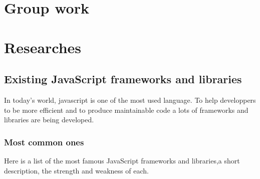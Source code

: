 \documentclass[12pt]{report}%
\begin{document}
\chapter{Group work}


\chapter{Researches}
\section{Existing JavaScript frameworks and libraries}
In today's world, javascript is one of the most used language. To help developpers to be more efficient and to produce maintainable code a lots of frameworks and libraries are being developed. 

\subsection{Most common ones}
Here is a list of the most famous JavaScript frameworks and libraries,a short description,  the strength and weakness of each.
\end{document}
